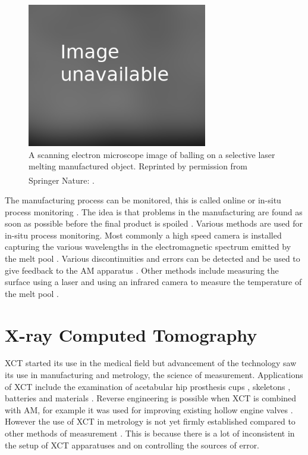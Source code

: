 \begin{figure}
  \centering
  \includegraphics[width=0.7\textwidth]{../figures/literatureReview/literature_balling.png}
  \caption{A scanning electron microscope image of balling on a selective laser melting manufactured object. Reprinted by permission from Springer Nature: \cite{li2012balling}\textsuperscript{\textcopyright}.}
  \label{fig:literature_balling}
\end{figure}

The manufacturing process can be monitored, this is called online or in-situ process monitoring \citep{everton2016review}. The idea is that problems in the manufacturing are found as soon as possible before the final product is spoiled \citep{cerniglia2015inspection}. Various methods are used for in-situ process monitoring. Most commonly a high speed camera is installed capturing the various wavelengths in the electromagnetic spectrum emitted by the melt pool \citep{berumen2010quality, craeghs2011online, lott2011design}. Various discontinuities and errors can be detected \citep{clijsters2014in} and be used to give feedback to the AM apparatus \citep{herzog2013method}. Other methods include measuring the surface using a laser \citep{cerniglia2015inspection} and using an infrared camera to measure the temperature of the melt pool \citep{rodriguez2012integration}. 

\section{X-ray Computed Tomography}

XCT started its use in the medical field but advancement of the technology saw its use in manufacturing and metrology, the science of measurement. Applications of XCT include the examination of acetabular hip prosthesis cups \citep{kourra2018computed}, skeletons \citep{appleby2014scoliosis}, batteries \citep{taiwo2017investigating} and materials \citep{zhang2016x, wang2017x}. Reverse engineering is possible when XCT is combined with AM, for example it was used for improving existing hollow engine valves \citep{cooper2015design}. However the use of XCT in metrology is not yet firmly established compared to other methods of measurement \citep{thompson2016x}. This is because there is a lot of inconsistent in the setup of XCT apparatuses and on controlling the sources of error.

